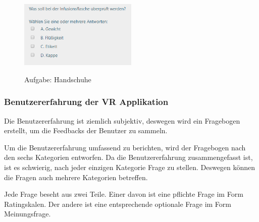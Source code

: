 \begin{enumerate}
\begin{figure}[ht]
\vspace*{1em}
\centering
\caption{Aufgabe: Handschuhe}
\includegraphics[width= 0.5\textwidth]{images/Aufgabe5.png}
\label{fig:Aufgabe5} 
\end{figure}
    
\end{enumerate}

\subsubsection{Benutzererfahrung der VR Applikation}

Die Benutzererfahrung ist ziemlich subjektiv, deswegen wird ein Fragebogen erstellt, um die Feedbacks der Benutzer zu sammeln.

Um die Benutzererfahrung umfassend zu berichten, wird der Fragebogen nach den sechs Kategorien \citep{28} entworfen. Da die Benutzererfahrung zusammengefasst ist, ist es schwierig, nach jeder einzigen Kategorie Frage zu stellen. Deswegen können die Fragen auch mehrere Kategorien betreffen.

Jede Frage beseht aus zwei Teile. Einer davon ist eine pflichte Frage im Form Ratingskalen. Der andere ist eine entsprechende optionale Frage im Form Meinungsfrage.

